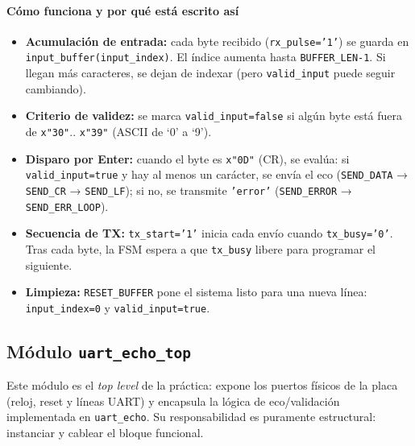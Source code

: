 \documentclass[a4paper,12pt]{article}
\begin{document}
\paragraph{Cómo funciona y por qué está escrito así}
\begin{itemize}
  \item \textbf{Acumulación de entrada:} cada byte recibido (\texttt{rx\_pulse='1'}) se guarda en \texttt{input\_buffer(input\_index)}. El índice aumenta hasta \texttt{BUFFER\_LEN-1}. Si llegan más caracteres, se dejan de indexar (pero \texttt{valid\_input} puede seguir cambiando).
  \item \textbf{Criterio de validez:} se marca \texttt{valid\_input=false} si algún byte está fuera de \texttt{x"30"}.. \texttt{x"39"} (ASCII de ‘0’ a ‘9’).
  \item \textbf{Disparo por Enter:} cuando el byte es \texttt{x"0D"} (CR), se evalúa: si \texttt{valid\_input=true} y hay al menos un carácter, se envía el eco (\texttt{SEND\_DATA} → \texttt{SEND\_CR} → \texttt{SEND\_LF}); si no, se transmite \texttt{'error'} (\texttt{SEND\_ERROR} → \texttt{SEND\_ERR\_LOOP}).
  \item \textbf{Secuencia de TX:} \texttt{tx\_start='1'} inicia cada envío cuando \texttt{tx\_busy='0'}. Tras cada byte, la FSM espera a que \texttt{tx\_busy} libere para programar el siguiente.
  \item \textbf{Limpieza:} \texttt{RESET\_BUFFER} pone el sistema listo para una nueva línea: \texttt{input\_index=0} y \texttt{valid\_input=true}.
\end{itemize}

\subsection{Módulo \texttt{uart\_echo\_top}}

Este módulo es el \emph{top level} de la práctica: expone los puertos físicos de la placa (reloj, reset y líneas UART) y encapsula la lógica de eco/validación implementada en \texttt{uart\_echo}. Su responsabilidad es puramente estructural: instanciar y cablear el bloque funcional.
\end{document}
